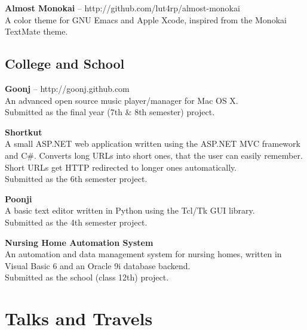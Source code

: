 \documentclass[11pt,a4paper]{moderncv}
\begin{document}
\cvlistitem
{\textbf{Almost Monokai} -- {\small http://github.com/lut4rp/almost-monokai}
\\A color theme for GNU Emacs and Apple Xcode, inspired from the Monokai TextMate theme.\\
}

\subsection{College and School}

\cvlistitem
{\textbf{Goonj} -- {\small http://goonj.github.com}
\\An advanced open source music player/manager for Mac OS X.
\\Submitted as the final year (7th \& 8th semester) project.\\
}

\cvlistitem
{\textbf{Shortkut}
\\A small ASP.NET web application written using the ASP.NET MVC framework and C\#. Converts long URLs into short ones, that the user can easily remember. Short URLs get HTTP redirected to longer ones automatically.
\\Submitted as the 6th semester project.\\
}

\cvlistitem
{\textbf{Poonji}
\\A basic text editor written in Python using the Tcl/Tk GUI library.
\\Submitted as the 4th semester project.\\
}

\cvlistitem
{\textbf{Nursing Home Automation System}
\\An automation and data management system for nursing homes, written in Visual Basic 6 and an Oracle 9i database backend.
\\Submitted as the school (class 12th) project.\\
}

\pagebreak

\section{Talks and Travels}
\end{document}
